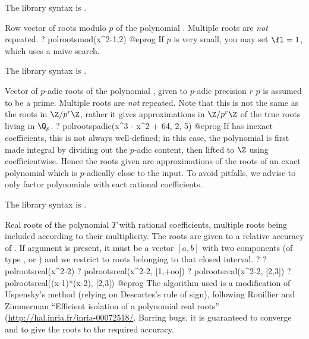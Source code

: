 The library syntax is .

\label{se:polrootsmod}
Row vector of roots modulo $p$ of the polynomial .
Multiple roots are \emph{not} repeated.
\bprog
? polrootsmod(x^2-1,2)
@eprog\noindent
If $p$ is very small, you may set $\fl=1$, which uses a naive search.

The library syntax is .

\label{se:polrootspadic}
Vector of $p$-adic roots of the polynomial , given to
$p$-adic precision $r$ $p$ is assumed to be a prime. Multiple roots are
\emph{not} repeated. Note that this is not the same as the roots in
$\Z/p^r\Z$, rather it gives approximations in $\Z/p^r\Z$ of the true roots
living in $\Q_p$.
\bprog
? polrootspadic(x^3 - x^2 + 64, 2, 5)
@eprog
If  has inexact  coefficients, this is not always
well-defined; in this case, the polynomial is first made integral by dividing
out the $p$-adic content, then lifted
to $\Z$ using  coefficientwise. Hence the roots given are
approximations of the roots of an exact polynomial which is $p$-adically
close to the input. To avoid pitfalls, we advise to only factor polynomials
with eact rational coefficients.

The library syntax is .

\label{se:polrootsreal}
Real roots of the polynomial $T$ with rational coefficients, multiple
roots being included according to their multiplicity. The roots are given
to a relative accuracy of . If argument  is
present, it must be a vector $[a,b]$ with two components (of type
,  or ) and we restrict to roots belonging
to that closed interval.
\bprog
? 
? polrootsreal(x^2-2)
? polrootsreal(x^2-2, [1,+oo])
? polrootsreal(x^2-2, [2,3])
? polrootsreal((x-1)*(x-2), [2,3])
@eprog\noindent
The algorithm used is a modification of Uspensky's method (relying on
Descartes's rule of sign), following Rouillier and Zimmerman ``Efficient
isolation of a polynomial real roots''
(\url{http://hal.inria.fr/inria-00072518/}. Barring bugs, it is guaranteed
to converge and to give the roots to the required accuracy.

